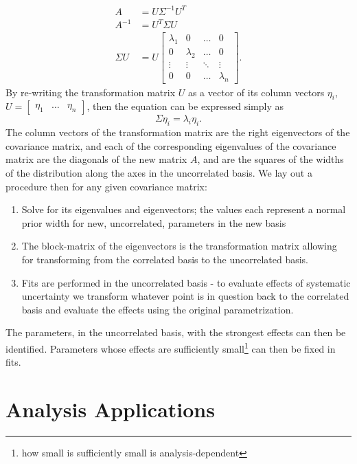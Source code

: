 \documentclass[main.tex]{subfiles}
\begin{document}
\begin{align} 
    A &= U\Sigma^{-1}U^{T}\\
    A^{-1}&= U^{T} \Sigma U \\
    \Sigma U &=  U\left[ \begin{array}{cccc}\lambda_{1} & 0 & \ldots & 0 \\
        0 & \lambda_{2} & \ldots & 0 \\
        \vdots & \vdots & \ddots & \vdots \\
        0 & 0 & \ldots & \lambda_{n} \end{array}\right].
\end{align}
By re-writing the transformation matrix $U$ as a vector of its column vectors $\eta_{i}$, $U=\left[\begin{array}{ccc}\eta_{1} & \ldots & \eta_{n} \end{array}\right]$, then the equation can be expressed simply as 
\begin{equation}
    \Sigma \eta_{i} = \lambda_{i}\eta_{i}.
\end{equation}
The column vectors of the transformation matrix are the right eigenvectors of the covariance matrix, and each of the corresponding eigenvalues of the covariance matrix are the diagonals of the new matrix $A$, and are the squares of the widths of the distribution along the axes in the uncorrelated basis. We lay out a procedure then for any given covariance matrix:
\begin{enumerate}
    \item Solve for its eigenvalues and eigenvectors; the values each represent a normal prior width for new, uncorrelated, parameters in the new basis
    \item The block-matrix of the eigenvectors is the transformation matrix allowing for transforming from the correlated basis to the uncorrelated basis. 
    \item Fits are performed in the uncorrelated basis - to evaluate effects of systematic uncertainty we transform whatever point is in question back to the correlated basis and evaluate the effects using the original parametrization. 
\end{enumerate}

The parameters, in the uncorrelated basis, with the strongest effects can then be identified. 
Parameters whose effects are sufficiently small\footnote{how small is sufficiently small is analysis-dependent} can then be fixed in fits. 

\section{Analysis Applications}\label{sec:analyis_app}
\end{document}
